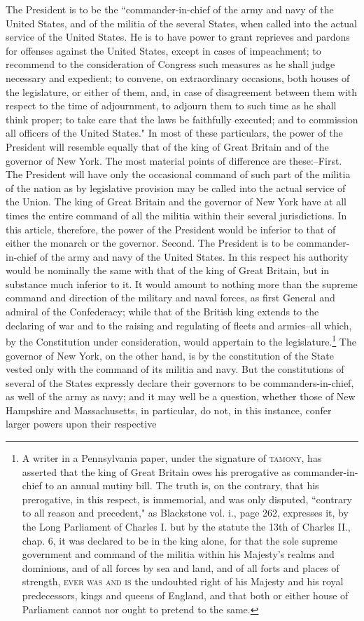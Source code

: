 The President is to be the ``commander-in-chief of the army and navy of the United States, and of the militia of the several States, when called into the actual service of the United States. He is to have power to grant reprieves and pardons for offenses against the United States, except in cases of impeachment; to recommend to the consideration of Congress such measures as he shall judge necessary and expedient; to convene, on extraordinary occasions, both houses of the legislature, or either of them, and, in case of disagreement between them with respect to the time of adjournment, to adjourn them to such time as he shall think proper; to take care that the laws be faithfully executed; and to commission all officers of the United States." In most of these particulars, the power of the President will resemble equally that of the king of Great Britain and of the governor of New York. The most material points of difference are these:--First. The President will have only the occasional command of such part of the militia of the nation as by legislative provision may be called into the actual service of the Union. The king of Great Britain and the governor of New York have at all times the entire command of all the militia within their several jurisdictions. In this article, therefore, the power of the President would be inferior to that of either the monarch or the governor. Second. The President is to be commander-in-chief of the army and navy of the United States. In this respect his authority would be nominally the same with that of the king of Great Britain, but in substance much inferior to it. It would amount to nothing more than the supreme command and direction of the military and naval forces, as first General and admiral of the Confederacy; while that of the British king extends to the declaring of war and to the raising and regulating of fleets and armies--all which, by the Constitution under consideration, would appertain to the legislature.\footnote{A writer in a Pennsylvania paper, under the signature of \textsc{tamony}, has asserted that the king of Great Britain owes his prerogative as commander-in-chief to an annual mutiny bill. The truth is, on the contrary, that his prerogative, in this respect, is immemorial, and was only disputed, ``contrary to all reason and precedent," as Blackstone vol. i., page 262, expresses it, by the Long Parliament of Charles I. but by the statute the 13th of Charles II., chap. 6, it was declared to be in the king alone, for that the sole supreme government and command of the militia within his Majesty's realms and dominions, and of all forces by sea and land, and of all forts and places of strength, \textsc{ever was and is }the undoubted right of his Majesty and his royal predecessors, kings and queens of England, and that both or either house of Parliament cannot nor ought to pretend to the same.} The governor of New York, on the other hand, is by the constitution of the State vested only with the command of its militia and navy. But the constitutions of several of the States expressly declare their governors to be commanders-in-chief, as well of the army as navy; and it may well be a question, whether those of New Hampshire and Massachusetts, in particular, do not, in this instance, confer larger powers upon their respective 